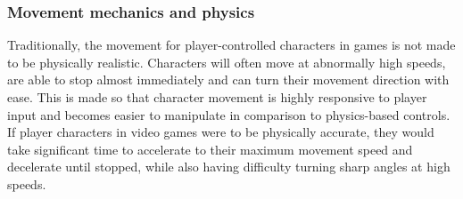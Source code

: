 
\subsubsection{Movement mechanics and physics}


Traditionally, the movement for player-controlled characters in games is not made to be physically realistic. Characters will often move at abnormally high speeds, are able to stop almost immediately and can turn their movement direction with ease. This is made so that character movement is highly responsive to player input and becomes easier to manipulate in comparison to physics-based controls. If player characters in video games were to be physically accurate, they would take significant time to accelerate to their maximum movement speed and decelerate until stopped, while also having difficulty turning sharp angles at high speeds.

